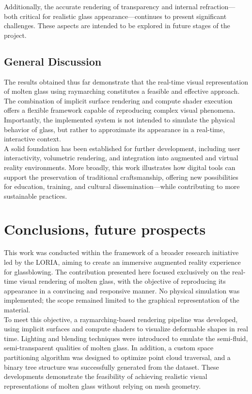 \documentclass{rapportcs}
\begin{document}
       Additionally, the accurate rendering of transparency and internal refraction—both critical for realistic glass appearance—continues to present significant challenges. These aspects are intended to be explored in future stages of the project.

    \newpage

    \subsection{General Discussion}

        The results obtained thus far demonstrate that the real-time visual representation of molten glass using raymarching constitutes a feasible and effective approach. The combination of implicit surface rendering and compute shader execution offers a flexible framework capable of reproducing complex visual phenomena. Importantly, the implemented system is not intended to simulate the physical behavior of glass, but rather to approximate its appearance in a real-time, interactive context. \\
        
        A solid foundation has been established for further development, including user interactivity, volumetric rendering, and integration into augmented and virtual reality environments. More broadly, this work illustrates how digital tools can support the preservation of traditional craftsmanship, offering new possibilities for education, training, and cultural dissemination—while contributing to more sustainable practices.

\newpage

\section{Conclusions, future prospects}

    This work was conducted within the framework of a broader research initiative led by the LORIA, aiming to create an immersive augmented reality experience for glassblowing. The contribution presented here focused exclusively on the real-time visual rendering of molten glass, with the objective of reproducing its appearance in a convincing and responsive manner. No physical simulation was implemented; the scope remained limited to the graphical representation of the material.\\
    
    To meet this objective, a raymarching-based rendering pipeline was developed, using implicit surfaces and compute shaders to visualize deformable shapes in real time. Lighting and blending techniques were introduced to emulate the semi-fluid, semi-transparent qualities of molten glass. In addition, a custom space partitioning algorithm was designed to optimize point cloud traversal, and a binary tree structure was successfully generated from the dataset. These developments demonstrate the feasibility of achieving realistic visual representations of molten glass without relying on mesh geometry.\\
    
\end{document}

